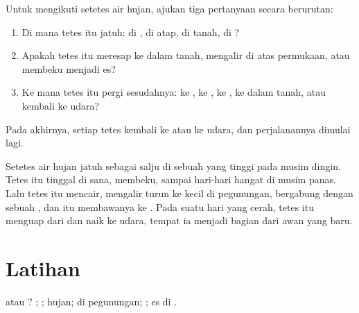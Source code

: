 \begin{method}\label{met:g2:water-on-earth:drop}
Untuk mengikuti setetes air hujan, ajukan tiga pertanyaan secara berurutan:
\begin{enumerate}
  \item Di mana tetes itu jatuh: di , di atap, di tanah, di ?
  \item Apakah tetes itu meresap ke dalam tanah, mengalir di atas
        permukaan, atau membeku menjadi es?
  \item Ke mana tetes itu pergi sesudahnya: ke , ke , ke ,
        ke dalam tanah, atau kembali ke udara?
\end{enumerate}
Pada akhirnya, setiap tetes kembali ke  atau ke udara, dan perjalanannya
dimulai lagi.
\end{method}

\begin{example}\label{ex:g2:water-on-earth:mountain}
Setetes air hujan jatuh sebagai salju di sebuah  yang tinggi pada
musim dingin. Tetes itu tinggal di sana, membeku, sampai hari-hari hangat
di musim panas. Lalu tetes itu mencair, mengalir turun ke  kecil di
pegunungan, bergabung dengan sebuah , dan  itu membawanya ke
. Pada suatu hari yang cerah, tetes itu menguap dari  dan naik ke
udara, tempat ia menjadi bagian dari awan yang baru.
\end{example}

\section{Latihan}

\begin{exercise}[$\star$]\label{exo:g2:water-on-earth:1}
 atau ? ; ; hujan;  di pegunungan;
; es di .
\end{exercise}

